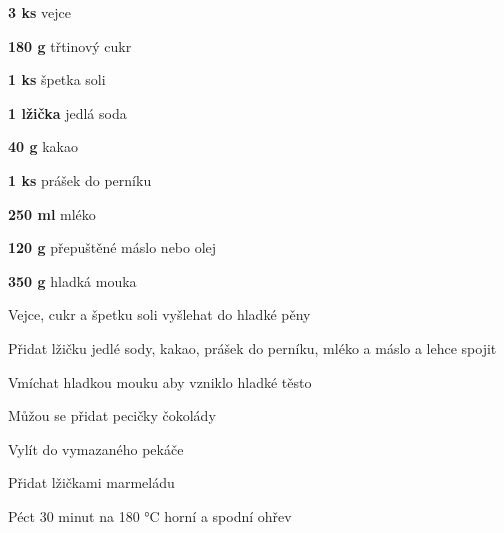 
\begin{ingredience}
  \item \textbf{3 ks} vejce
  \item \textbf{180 g} třtinový cukr
  \item \textbf{1 ks} špetka soli
  \item \textbf{1 lžička} jedlá soda
  \item \textbf{40 g} kakao
  \item \textbf{1 ks} prášek do perníku
  \item \textbf{250 ml} mléko
  \item \textbf{120 g} přepuštěné máslo nebo olej
  \item \textbf{350 g} hladká mouka
\end{ingredience}

\begin{postup}
  \item Vejce, cukr a špetku soli vyšlehat do hladké pěny
  \item Přidat lžičku jedlé sody, kakao, prášek do perníku, mléko a máslo a lehce spojit
  \item Vmíchat hladkou mouku aby vzniklo hladké těsto
  \item Můžou se přidat pecičky čokolády
  \item Vylít do vymazaného pekáče
  \item Přidat lžičkami marmeládu
  \item Péct 30 minut na 180 °C horní a spodní ohřev
\end{postup}
